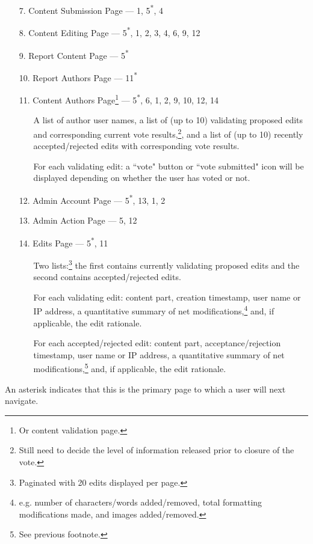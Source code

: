\documentclass[12pt,letterpaper]{article}
\begin{document}
\begin{enumerate}
\begin{enumerate}
\end{enumerate}
\item[7.] Content Submission Page --- 1, 5\textsuperscript{*}, 4
\item[8.] Content Editing Page --- 5\textsuperscript{*}, 1, 2, 3, 4, 6, 9, 12
\item[9.] Report Content Page --- 5\textsuperscript{*}
\item[10.] Report Authors Page --- 11\textsuperscript{*}
\item[11.] Content Authors Page\footnote{Or content validation page.} --- 5\textsuperscript{*}, 6, 1, 2, 9, 10, 12, 14
\begin{enumerate}
\item[] A list of author user names, a list of (up to 10) validating proposed edits and corresponding current vote results,\footnote{Still need to decide the level of information released prior to closure of the vote.}, and a list of (up to 10) recently accepted/rejected edits with corresponding vote results.
\item[] For each validating edit: a ``vote" button or ``vote submitted" icon will be displayed depending on whether the user has voted or not.
\end{enumerate}
\item[12.] Admin Account Page --- 5\textsuperscript{*}, 13, 1, 2
\item[13.] Admin Action Page --- 5, 12
\item[14.] Edits Page --- 5\textsuperscript{*}, 11
\begin{enumerate}
\item[] Two lists:\footnote{Paginated with 20 edits displayed per page.} the first contains currently validating proposed edits and the second contains accepted/rejected edits.
\item[] For each validating edit: content part, creation timestamp, user name or IP address, a quantitative summary of net modifications,\footnote{e.g. number of characters/words added/removed, total formatting modifications made, and images added/removed.} and, if applicable, the edit rationale.
\item[] For each accepted/rejected edit: content part, acceptance/rejection timestamp, user name or IP address, a quantitative summary of net modifications,\footnote{See previous footnote.} and, if applicable, the edit rationale.
\end{enumerate}
\end{enumerate}

An asterisk indicates that this is the primary page to which a user will next navigate. 
\end{document}
